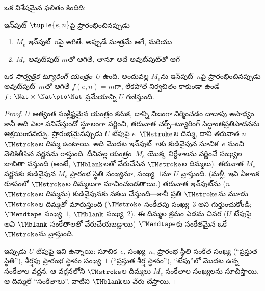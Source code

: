\documentclass[../../../include/open-logic-section]{subfiles}
\begin{document}
ఒక విశేషమైన ఫలితం కిందిది:

\begin{thm} ఇన్‌పుట్ $\tuple{e,n}$పై ప్రారంభించినప్పుడు
  \begin{enumerate}
    \item $M_e$ ఇన్‌పుట్~$n$పై ఆగితే, అప్పుడే మాత్రమే ఆగే, మరియు
    \item $M_e$ అవుట్‌పుట్ $m$తో ఆగితే, తానూ అదే అవుట్‌పుట్‌తో ఆగే
  \end{enumerate}
  ఒక \emph{సార్వత్రిక ట్యూరింగ్ యంత్రం}~$U$ ఉంది. అందువల్ల $M_e$ను
  ఇన్‌పుట్~$n$పై ప్రారంభించినప్పుడు అవుట్‌పుట్~$m$తో ఆగితే
  $f(e,n) = m$గా, లేకపోతే నిర్వచితం కాకుండా ఉండే
  $f\colon \Nat \times \Nat \pto \Nat$ ప్రమేయాన్ని $U$ గణిస్తుంది.
\end{thm}

\begin{proof}
  $U$ అత్యంత సంక్లిష్టమైన యంత్రం కనుక, దాన్ని నిజంగా నిర్మించడం దాదాపు అసాధ్యం.
  కానీ అది ఎలా పనిచేస్తుందో స్థూలంగా వర్ణించి, తరువాత చర్చ్--ట్యూరింగ్
  సిద్ధాంతప్రతిపాదనను ఆశ్రయించవచ్చు. ప్రారంభమైనప్పుడు $U$ టేపుపై
  $e$~$\TMstroke$ల దిమ్మ, దాని తరువాత $n$~$\TMstroke$ల దిమ్మ ఉంటాయి.
  అది మొదట ఇన్‌పుట్~$n$కు కుడివైపున సూచిక~$e$ నుంచి వెలికితీసిన వర్ణనను రాస్తుంది.
  దీనివల్ల యంత్రం~$M_e$ యొక్క నిర్దేశాలను వర్ణించే సంఖ్యల జాబితా వస్తుంది
  (అంటే, $\TMblank$లతో వేరుచేసిన $\TMstroke$ల దిమ్మలు). తరువాత $M_e$
  వర్ణనకు కుడివైపున $M_e$ ప్రారంభ స్థితి సంఖ్యనూ, సంఖ్య~$1$నూ $U$
  వ్రాస్తుంది. (మళ్లీ, ఇవి ఏకాంక రూపంలో $\TMstroke$ల దిమ్మలుగా
  సూచించబడతాయి.) తరువాత ఇన్‌పుట్‌ను ($n$~$\TMstroke$ల దిమ్మను) కుడివైపునకు
  నకలు చేస్తుంది---కానీ ప్రతి $\TMstroke$ను మూడు $\TMstroke$ల దిమ్మతో
  మారుస్తుంది ($\TMstroke$ సంకేతపు సంఖ్య~$3$ అని గుర్తుంచుకోండి;
  $\TMendtape$ సంఖ్య~$1$, $\TMblank$ సంఖ్య~$2$). ఈ దిమ్మల క్రమం ఎడమ చివర
  ($U$ టేపుపై అవి $\TMblank$ సంకేతాలతో వేరుచేయబడ్డాయి) $\TMendtape$కు
  సంకేతమైన ఒకే~$\TMstroke$ను వ్రాస్తుంది.

  ఇప్పుడు $U$ టేపుపై ఇవి ఉన్నాయి: సూచిక~$e$, సంఖ్య~$n$, ప్రారంభ స్థితి
  సంకేత సంఖ్య (``ప్రస్తుత స్థితి''), శీర్షపు ప్రారంభ స్థానం సంఖ్య~$1$
  (``ప్రస్తుత శీర్ష స్థానం''), ``టేపు''లో మొదట ఉన్న సంకేతాల వర్ణన.
  ఆ వర్ణనలోని $\TMstroke$ల దిమ్మలు $M_e$ సంకేతాల సంఖ్యలను సూచిస్తాయి.
  ఆ దిమ్మలే ``సంకేతాలు''. వాటిని $\TMblank$లు వేరు చేస్తాయి.


\end{proof}
\end{document}
